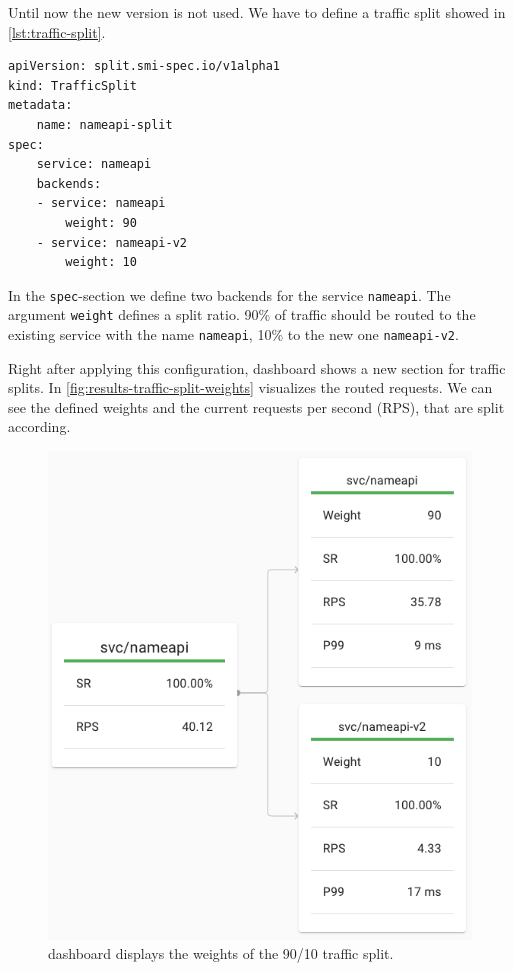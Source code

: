 Until now the new version is not used.
We have to define a traffic split showed in \autoref{lst:traffic-split}.

\begin{lstlisting}[caption={YAML configuration of 90/10 traffic split. 90\% of requests are routed to \lstinline|nameapi| and 10\% to \lstinline|nameapi-v2|.}, label={lst:traffic-split}]
apiVersion: split.smi-spec.io/v1alpha1
kind: TrafficSplit
metadata:
	name: nameapi-split
spec:
	service: nameapi
	backends:
	- service: nameapi
		weight: 90
	- service: nameapi-v2
		weight: 10
\end{lstlisting}

In the \lstinline|spec|-section we define two backends for the service \lstinline|nameapi|.
The argument \lstinline|weight| defines a split ratio.
90\% of traffic should be routed to the existing service with the name \lstinline|nameapi|, 10\% to the new one \lstinline|nameapi-v2|.

Right after applying this configuration, \linkerd{} dashboard shows a new section for traffic splits.
In \autoref{fig:results-traffic-split-weights} \linkerd{} visualizes the routed requests.
We can see the defined weights and the current requests per second (RPS), that are split according.

\begin{figure}
	\includegraphics[width=\columnwidth]{img/results-traffic-split-weights}
	\caption{\linkerd{} dashboard displays the weights of the 90/10 traffic split.}
	\label{fig:results-traffic-split-weights}
\end{figure}


